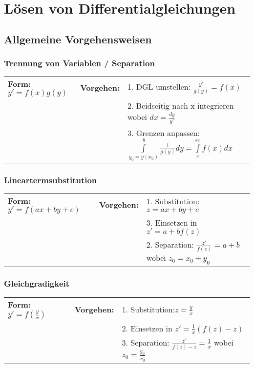 
\section{Lösen von Differentialgleichungen}
    \subsection{Allgemeine Vorgehensweisen}
        \subsubsection{Trennung von Variablen / Separation}
            \begin{tabular}{p{4cm}p{1.5cm}p{10.5cm}}
                \textbf{Form:} $y' = f(x) g(y)$ &
                \textbf{Vorgehen:}              &
                1. DGL umstellen: $\frac{y'}{g(y)} = f(x)$ \\ &&
                2. Beidseitig nach x integrieren wobei $dx = \frac{dy}{y'}$ \\ &&
                3. Grenzen anpassen: $\int\limits_{y_0=y(x_0)}^{y} \frac{1}{g(y)} dy =
                \int\limits_{x}^{x_0}f(x) dx$
            \end{tabular}
            
        \subsubsection{Lineartermsubstitution}
            \begin{tabular}{p{4cm}p{1.5cm}p{10.5cm}}
                \textbf{Form:} $y'=f(ax+by+c)$   &
                \textbf{Vorgehen:}               &
                1. Substitution: $z=ax+by+c$ \\ &&
                3. Einsetzen in $z'=a+bf(z)$\\ &&
                2. Separation: $\frac{z'}{f(z)} = a + b$ wobei $z_0 = x_0 + y_0$
            \end{tabular}
                
        \subsubsection{Gleichgradigkeit}
            \begin{tabular}{p{4cm}p{1.5cm}p{10.5cm}}
                \textbf{Form:} $y'=f(\frac{y}{x})$ &
                \textbf{Vorgehen:}                &
                1. Substitution:\quad $z=\frac{y}{x}$\\ &&
                2. Einsetzen in $z'=\frac{1}{x}(f(z)-z)$\\ &&
                3. Separation: $\frac{z'}{f(z)-z} = \frac{1}{x}$ wobei $z_0 = \frac{y_0}{x_0}$ 
            \end{tabular}
            

